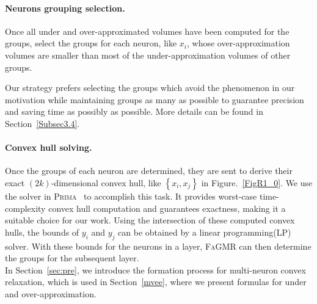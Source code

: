 \documentclass[runningheads]{llncs}
\newcommand{\ourtool}{\textsc{FaGMR}\xspace}
\newcommand{\prima}{\textsc{Prima}\xspace}
\begin{document}
\paragraph{Neurons grouping selection.}
Once all under and over-approximated volumes have been computed for the groups,
select the groups for each neuron, like $x_{i}$, whose over-approximation volumes are smaller than most of the under-approximation volumes of other groups.

Our strategy prefers selecting the groups which avoid the phenomenon in our motivation while maintaining groups as many as possible to guarantee precision and saving time as possibly as possible. More details can be found in Section~\ref{Subsec3.4}.

\paragraph{Convex hull solving.}
Once the groups of each neuron are determined, they are sent to derive their exact $(2k)$-dimensional convex hull,
like $\left\{x_{i},x_{j}\right\}$ in Figure.~\ref{FigR1_0}.
We use the solver in \prima~\cite{DBLP:journals/pacmpl/MullerMSPV22} to accomplish this task.
It provides worst-case time-complexity convex hull computation
and guarantees exactness, making it a suitable choice
for our work.
Using the intersection of these computed convex hulls, the bounds of $y_{i}$ and $y_{j}$
can be obtained by a linear programming(LP) solver.
With these bounds for the neurons in a layer, \ourtool can then determine the groups for the subsequent layer.\\
In Section~\ref{sec:pre}, we introduce the formation process for multi-neuron convex relaxation, which is used in Section~\ref{mvee}, where we present formulas for under and over-approximation.
\end{document}
